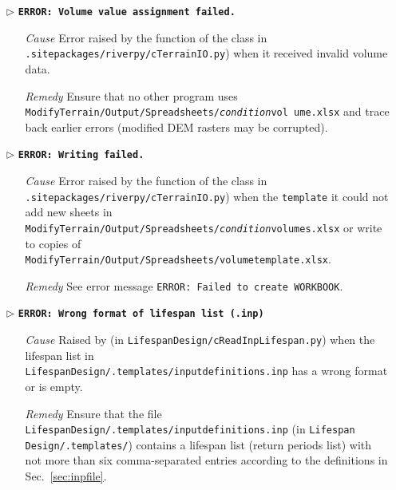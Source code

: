 \begin{itemize}
	\item[$\triangleright$]\textbf{\texttt{ERROR: Volume value assignment failed.}}
	\begin{itemize}
		\item[\textit{Cause}\hspace{0.27cm}] Error raised by the  function of the  class in \texttt{.site{\myUnderscore}packages/riverpy/cTerrainIO.py}) when it received invalid volume data.
		\item[\textit{Remedy}] Ensure that no other program uses \texttt{ModifyTerrain/Output/Spreadsheets/\textit{condition}{\myUnderscore}vol ume.xlsx} and trace back earlier errors (modified DEM rasters may be corrupted).\\
	\end{itemize}
	
	\item[$\triangleright$]\textbf{\texttt{ERROR: Writing failed.}}
	\begin{itemize}
		\item[\textit{Cause}\hspace{0.27cm}] Error raised by the  function of the  class in \texttt{.site{\myUnderscore}packages/riverpy/cTerrainIO.py}) when the \texttt{template} it could not add new sheets in \texttt{ModifyTerrain/Output/Spreadsheets/\textit{condition}{\myUnderscore}volumes.xlsx} or write to copies of \texttt{ModifyTerrain/Output/Spreadsheets/volume{\myUnderscore}template.xlsx}.
		\item[\textit{Remedy}] See error message \texttt{ERROR: Failed to create WORKBOOK}.\\
	\end{itemize}
	
	\item[$\triangleright$]\textbf{\texttt{ERROR: Wrong format of lifespan list (.inp)}}
	\begin{itemize}
		\item[\textit{Cause}\hspace{0.27cm}] Raised by  (in \texttt{LifespanDesign/cReadInpLifespan.py}) when the lifespan list in\\ \texttt{LifespanDesign/.templates/input{\myUnderscore}definitions.inp} has a wrong format or is empty.
		\item[\textit{Remedy}] Ensure that the file \texttt{LifespanDesign/.templates/input{\myUnderscore}definitions.inp} (in \texttt{Lifespan Design/.templates/}) contains a lifespan list (return periods list) with not more than six comma-separated entries according to the definitions in Sec.~\ref{sec:inpfile}.\\
	\end{itemize}
	

\end{itemize}
